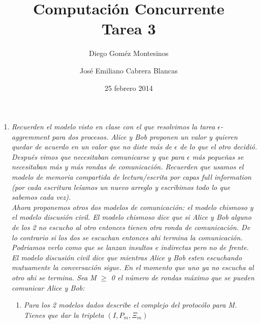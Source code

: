 \documentclass{article}
\title{Computación Concurrente \\ \Large{Tarea 3}}
\author{
  Diego Goméz Montesinos
  \and
  José Emiliano Cabrera Blancas
  }
\date{25 febrero 2014}
\begin{document}
\maketitle
\begin{enumerate}

\item{
    \textsl{
    Recuerden el modelo visto en clase con el que resolvimos la tarea
    $\epsilon$-aggremment para dos procesos. Alice y Bob proponen un valor y
    quieren quedar de acuerdo en un valor que no diste más de $\epsilon$ de lo
    que el otro decidió. Después vimos que necesitaban comunicarse y que para 
    $\epsilon$ más pequeñas se necesitaban más y más rondas de comunicación.
    Recuerden que usamos el modelo de memoria compartida de lectura/escrita por
    capas \textit{full information} (por cada escritura leíamos un nuevo
    arreglo y escribimos todo lo que sabemos cada vez).\\
    Ahora proponemos otros dos modelos de comunicación: el modelo chismoso y el
    modelo discusión civil. El modelo chismoso dice que si Alice y Bob alguno de
    los 2 no escucho al otro entonces tienen otra ronda de comunicación. De lo
    contrario si los dos se escuchan entonces ahi termina la comunicación.
    Podriamos verlo como que se lanzan insultos e indirectas pero no de frente.\\
    El modelo discusión civil dice que mientras Alice y Bob esten escuchando 
    mutuamente la conversación sigue. En el momento que uno ya no escucha al otro
    ahi se termina.
    Sea \textit{M} $≥$ 0 el número de rondas máximo que se pueden comunicar Alice
    y Bob:}

    \begin{enumerate}
      \item{\textsl{Para los 2 modelos dados describe el complejo del protocólo para M. 
        Tienes que dar la tripleta $(I,P_m,\Xi_m)$}}\\\\
        

\end{enumerate}}
\end{enumerate}
\end{document}
